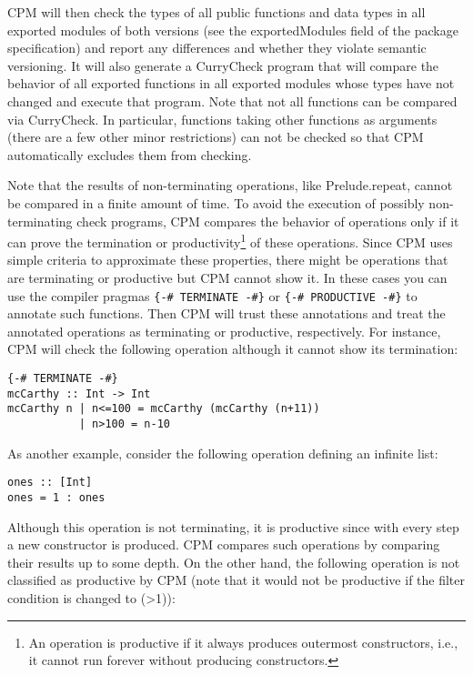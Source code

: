 \documentclass[11pt]{article}
\renewcommand{\tt}{\usefont{OT1}{cmtt}{m}{n}\selectfont}
\newcommand{\codefont}{\small\tt}
\newcommand{\code}[1]{\mbox{\codefont #1}}
\begin{document}
CPM will then check the types of all public functions and data types in all
exported modules of both versions (see the \code{exportedModules} field of the
package specification) and report any differences and whether they violate 
semantic versioning. It will also generate a CurryCheck program that will 
compare the behavior of all exported functions in all exported modules whose
types have not changed and execute that program. Note that not all functions
can be compared via CurryCheck.
In particular, functions taking other functions as arguments
(there are a few other minor restrictions)
can not be checked so that CPM automatically excludes them from checking.

Note that the results of non-terminating operations, like \code{Prelude.repeat},
cannot be compared in a finite amount of time.
To avoid the execution of possibly non-terminating check programs,
CPM compares the behavior of operations
only if it can prove the termination or productivity\footnote{%
An operation is productive if it always produces outermost constructors,
i.e., it cannot run forever without producing constructors.}
of these operations.
Since CPM uses simple criteria to approximate these properties,
there might be operations that are terminating or productive
but CPM cannot show it. In these cases you can use the compiler pragmas
\verb|{-# TERMINATE -#}| or \verb|{-# PRODUCTIVE -#}| to annotate such
functions. Then CPM will trust these annotations and treat
the annotated operations as terminating or productive, respectively.
For instance, CPM will check the following operation although
it cannot show its termination:

\begin{lstlisting}
{-# TERMINATE -#}
mcCarthy :: Int -> Int
mcCarthy n | n<=100 = mcCarthy (mcCarthy (n+11))
           | n>100 = n-10
\end{lstlisting}
%
As another example, consider the following operation defining
an infinite list:

\begin{lstlisting}
ones :: [Int]
ones = 1 : ones
\end{lstlisting}
%
Although this operation is not terminating, it is productive
since with every step a new constructor is produced.
CPM compares such operations by comparing their results up to
some depth.
On the other hand, the following operation is not classified
as productive by CPM (note that it would not be productive if the
filter condition is changed to \code{(>1)}):
\end{document}
